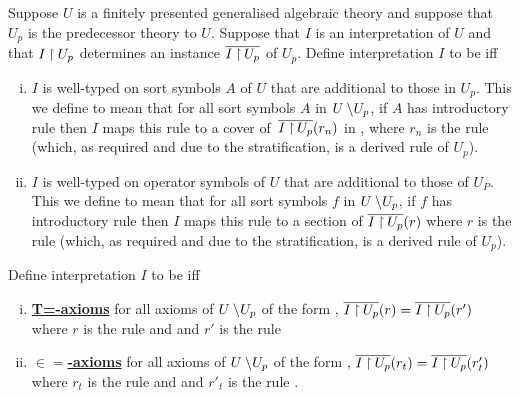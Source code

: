 \begin{definition}
Suppose $U$ is a finitely presented generalised algebraic theory and 
suppose that $U_p$ is the predecessor theory to $U$. Suppose that $I$ is an interpretation of $U$  and that  $I \mathbin{\restriction} U_p$  
determines an instance $\overline{I \mathbin{\restriction} U_p}$ of $U_p$.
Define interpretation $I$ to be   iff 

\begin{enumerate}[(i)]
\item
$I$ is well-typed on sort symbols $A$ of $U$ that are additional to those in $U_p$. This we define to mean that
for all sort symbols $A$ in $U \setminus\kern-2pt U_p$, if $A$ has introductory rule 
\genericAintroductoryrule then $I$ maps this rule to a cover of \,$\overline{I \mathbin{\restriction} U_p}(r_n)$ in \catc, where $r_n$ is the rule 
 (which, as required and due to the stratification, is a derived rule of $U_p$).
\item  $I$ is well-typed on operator symbols  of $U$ that are additional to those of $U_P$. This we define to mean that
for all sort symbols $f$ in $U \setminus\kern-2pt U_p$, if $f$ has introductory rule 
\genericfintroductoryrule then $I$ maps this rule to a section 
of $\overline{I \mathbin{\restriction} U_p}(r)$ where $r$ is the rule
 (which, as required and due to the stratification, is a derived rule of $U_p$). 
\end{enumerate}

Define interpretation $I$ to be   iff  
\begin{enumerate}[(i)]
\item \underline{\textbf{T=-axioms}} 
for all axioms of $U \setminus\kern-2pt U_p$ of the form
 ,
$\overline{I \mathbin{\restriction} U_p}(r) = \overline{I \mathbin{\restriction} U_p}(r')$ where $r$ is the rule
 and  
and $r'$ is the rule 
\item \underline{\textbf{$\boldsymbol{\in=}$-axioms}} 
for all axioms of $U \setminus\kern-2pt U_p$ of the form
,
$\overline{I \mathbin{\restriction} U_p}(r_t) = \overline{I \mathbin{\restriction} U_p}(r'_t)$ where $r_t$ is the rule
 and  
and $r'_t$ is the rule .
\end{enumerate}
\end{definition}

